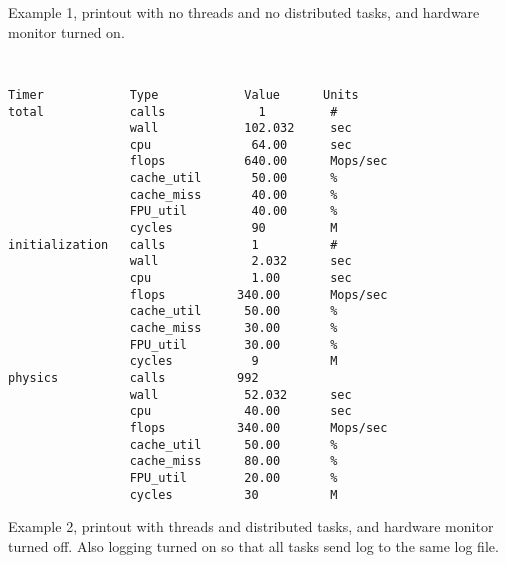 Example 1, printout with no threads and no distributed tasks, and
hardware monitor turned on.
{\tt
\begin{verbatim}
Timer            Type            Value      Units
total            calls             1         #
                 wall            102.032     sec
                 cpu              64.00      sec
                 flops           640.00      Mops/sec
                 cache_util       50.00      %      
                 cache_miss       40.00      %      
                 FPU_util         40.00      %      
                 cycles           90         M
initialization   calls            1          #
                 wall             2.032      sec
                 cpu              1.00       sec
                 flops          340.00       Mops/sec
                 cache_util      50.00       %      
                 cache_miss      30.00       %      
                 FPU_util        30.00       %      
                 cycles           9          M
physics          calls          992
                 wall            52.032      sec
                 cpu             40.00       sec
                 flops          340.00       Mops/sec
                 cache_util      50.00       %      
                 cache_miss      80.00       %      
                 FPU_util        20.00       %      
                 cycles          30          M
\end{verbatim}
}

Example 2, printout with threads and distributed tasks, and
hardware monitor turned off. Also logging turned on so that
all tasks send log to the same log file.

